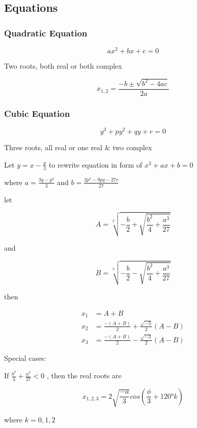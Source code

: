 \documentclass[
]{book}
\begin{document}
\hypertarget{equations}{%
\subsection{Equations}\label{equations}}

\hypertarget{quadratic-equation}{%
\subsubsection*{Quadratic Equation}\label{quadratic-equation}}

\[ax^2 + bx + c =0\]

Two roots, both real or both complex

\[x_{1,2} = \frac{-b \pm \sqrt{b^2 - 4ac}}{2a}\]

\hypertarget{cubic-equation}{%
\subsubsection*{Cubic Equation}\label{cubic-equation}}

\[y^3 + py^2 + qy + r = 0\]

Three roots, all real or one real \& two complex

Let \(y = x - \frac{p}{3}\) to rewrite equation in form of \(x^3 + ax + b = 0\)

where \(a = \frac{3q - p^2}{3}\) and \(b = \frac{2p^3 - 9pq - 27r}{27}\)

let

\[ A = \sqrt[3]{-\frac{b}{2} + \sqrt{\frac{b^2}{4} + \frac{a^3}{27}}}\]

and

\[B =\sqrt[3]{-\frac{b}{2} - \sqrt{\frac{b^2}{4} + \frac{a^3}{27}}} \]

then

\begin{align}
x_1 &= A + B\\
x_2 &= \frac{-(A + B)}{2} + \frac{\sqrt{-3}}{2} (A - B)\\
x_3 &= \frac{-(A + B)}{2} - \frac{\sqrt{-3}}{2} (A - B)
\end{align}

Special cases:

If \(\frac{b^2}{4} + \frac{a^3}{27} < 0\) , then the real roots are

\[x_{1,2,3} = 2 \sqrt{\frac{-a}{3}} cos \left( \frac{\phi}{3} + 120° k \right)\]

where \(k = 0,1,2\)
\end{document}
